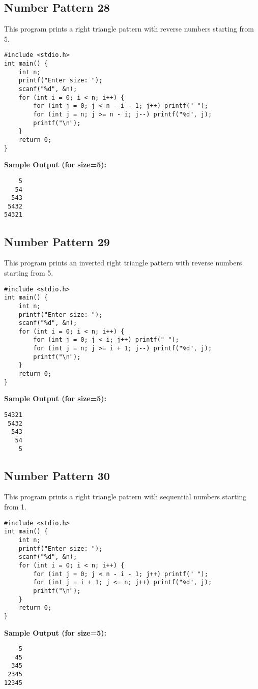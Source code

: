 \documentclass[a4paper,12pt]{article}
\begin{document}
\subsection{Number Pattern 28}
This program prints a right triangle pattern with reverse numbers starting from 5.
\begin{lstlisting}[caption={Number Pattern 28}]
#include <stdio.h>
int main() {
    int n;
    printf("Enter size: ");
    scanf("%d", &n);
    for (int i = 0; i < n; i++) {
        for (int j = 0; j < n - i - 1; j++) printf(" ");
        for (int j = n; j >= n - i; j--) printf("%d", j);
        printf("\n");
    }
    return 0;
}
\end{lstlisting}
\textbf{Sample Output (for size=5):}
\begin{verbatim}
    5
   54
  543
 5432
54321
\end{verbatim}
\clearpage

\subsection{Number Pattern 29}
This program prints an inverted right triangle pattern with reverse numbers starting from 5.
\begin{lstlisting}[caption={Number Pattern 29}]
#include <stdio.h>
int main() {
    int n;
    printf("Enter size: ");
    scanf("%d", &n);
    for (int i = 0; i < n; i++) {
        for (int j = 0; j < i; j++) printf(" ");
        for (int j = n; j >= i + 1; j--) printf("%d", j);
        printf("\n");
    }
    return 0;
}
\end{lstlisting}
\textbf{Sample Output (for size=5):}
\begin{verbatim}
54321
 5432
  543
   54
    5
\end{verbatim}
\clearpage

\subsection{Number Pattern 30}
This program prints a right triangle pattern with sequential numbers starting from 1.
\begin{lstlisting}[caption={Number Pattern 30}]
#include <stdio.h>
int main() {
    int n;
    printf("Enter size: ");
    scanf("%d", &n);
    for (int i = 0; i < n; i++) {
        for (int j = 0; j < n - i - 1; j++) printf(" ");
        for (int j = i + 1; j <= n; j++) printf("%d", j);
        printf("\n");
    }
    return 0;
}
\end{lstlisting}
\textbf{Sample Output (for size=5):}
\begin{verbatim}
    5
   45
  345
 2345
12345
\end{verbatim}
\clearpage
\end{document}
